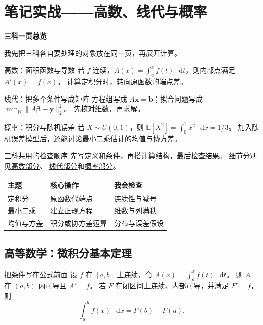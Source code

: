 \documentclass[UTF8,11pt,a4paper,oneside,openany,linespread=1]{ctexbook}
\newcommand{\dd}{\mathop{}\!\mathrm{d}}
\newcommand{\E}{\mathbb{E}}
\numberwithin{equation}{chapter}
\begin{document}
\setcounter{chapter}{5}
\chapter{笔记实战——高数、线代与概率}
\noindent\textbf{三科一页总览}\par
我先把三科各自要处理的对象放在同一页，再展开计算。

\begin{conceptbox}{高数：面积函数与导数}
若 \(f\) 连续，\(A(x)=\int_a^x f(t)\,\dd t\)，则内部点满足 \(A'(x)=f(x)\)。
计算定积分时，转向原函数的端点差。
\end{conceptbox}
\begin{conceptbox}{线代：把多个条件写成矩阵}
方程组写成 \(A\bm{x}=\bm{b}\)；拟合问题写成
\(\min_{\bm{\beta}}\lVert A\bm{\beta}-\bm{y}\rVert_2^2\)。
先核对维数，再求解。
\end{conceptbox}
\begin{conceptbox}{概率：积分与随机误差}
若 \(X\sim U(0,1)\)，则 \(\E[X^2]=\int_0^1 x^2\,\dd x=1/3\)。
加入随机误差模型后，还能讨论最小二乘估计的均值与协方差。
\end{conceptbox}
\begin{methodbox}{三科共用的检查顺序}
先写定义和条件，再搭计算结构，最后检查结果。
细节分别见\hyperref[ch:calculus]{高数部分}、
\hyperref[ch:linear]{线代部分}和\hyperref[ch:probability]{概率部分}。
\end{methodbox}
\begin{center}
\begin{tabular}{lll}
\toprule
主题 & 核心操作 & 我会检查 \\
\midrule
定积分 & 原函数代端点 & 连续性与减号 \\
最小二乘 & 建立正规方程 & 维数与列满秩 \\
均值与方差 & 积分或协方差运算 & 分布与误差假设 \\
\bottomrule
\end{tabular}
\end{center}

\clearpage
\section{高等数学：微积分基本定理}\label{ch:calculus}
\begin{conceptbox}{把条件写在公式前面}
设 \(f\) 在 \([a,b]\) 上连续，令 \(A(x)=\int_a^x f(t)\,\dd t\)。
则 \(A\) 在 \((a,b)\) 内可导且 \(A'=f\)。
若 \(F\) 在闭区间上连续、内部可导，并满足 \(F'=f\)，则
\begin{equation}\label{eq:ftc}
  \int_a^b f(x)\,\dd x=F(b)-F(a).
\end{equation}
\end{conceptbox}
\end{document}
